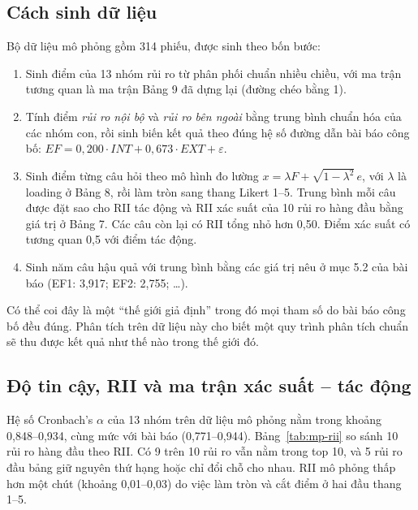 \subsection{Cách sinh dữ liệu}

Bộ dữ liệu mô phỏng gồm 314 phiếu, được sinh theo bốn bước:
\begin{enumerate}
  \item Sinh điểm của 13 nhóm rủi ro từ phân phối chuẩn nhiều chiều, với ma trận tương quan là ma trận Bảng 9 đã dựng lại (đường chéo bằng 1).
  \item Tính điểm \emph{rủi ro nội bộ} và \emph{rủi ro bên ngoài} bằng trung bình chuẩn hóa của các nhóm con, rồi sinh biến kết quả theo đúng hệ số đường dẫn bài báo công bố: $EF = 0{,}200 \cdot INT + 0{,}673 \cdot EXT + \varepsilon$.
  \item Sinh điểm từng câu hỏi theo mô hình đo lường $x = \lambda F + \sqrt{1 - \lambda^2}\,e$, với $\lambda$ là loading ở Bảng 8, rồi làm tròn sang thang Likert 1--5. Trung bình mỗi câu được đặt sao cho RII tác động và RII xác suất của 10 rủi ro hàng đầu bằng giá trị ở Bảng 7. Các câu còn lại có RII tổng nhỏ hơn 0,50. Điểm xác suất có tương quan 0,5 với điểm tác động.
  \item Sinh năm câu hậu quả với trung bình bằng các giá trị nêu ở mục 5.2 của bài báo (EF1: 3,917; EF2: 2,755; \ldots).
\end{enumerate}

Có thể coi đây là một ``thế giới giả định'' trong đó mọi tham số do bài báo công bố đều đúng. Phân tích trên dữ liệu này cho biết một quy trình phân tích chuẩn sẽ thu được kết quả như thế nào trong thế giới đó.

\subsection{Độ tin cậy, RII và ma trận xác suất -- tác động}

Hệ số Cronbach's $\alpha$ của 13 nhóm trên dữ liệu mô phỏng nằm trong khoảng 0,848--0,934, cùng mức với bài báo (0,771--0,944). Bảng~\ref{tab:mp-rii} so sánh 10 rủi ro hàng đầu theo RII. Có 9 trên 10 rủi ro vẫn nằm trong top 10, và 5 rủi ro đầu bảng giữ nguyên thứ hạng hoặc chỉ đổi chỗ cho nhau. RII mô phỏng thấp hơn một chút (khoảng 0,01--0,03) do việc làm tròn và cắt điểm ở hai đầu thang 1--5.

